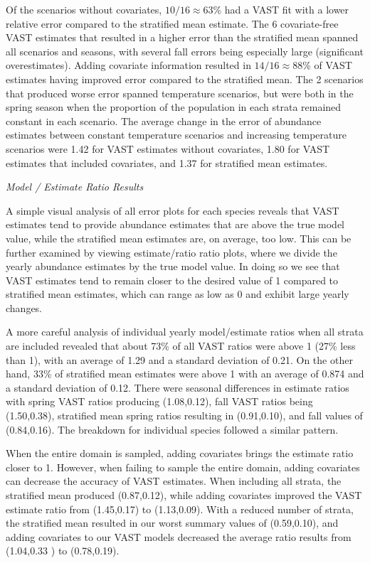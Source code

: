 \documentclass[
  12pt,
]{article}
\begin{document}
Of the scenarios without covariates, \(10/16\approx63\)\% had a VAST fit with a lower relative error compared to the stratified mean estimate. The 6 covariate-free VAST estimates that resulted in a higher error than the stratified mean spanned all scenarios and seasons, with several fall errors being especially large (significant overestimates). Adding covariate information resulted in \(14/16\approx88\)\% of VAST estimates having improved error compared to the stratified mean. The 2 scenarios that produced worse error spanned temperature scenarios, but were both in the spring season when the proportion of the population in each strata remained constant in each scenario. The average change in the error of abundance estimates between constant temperature scenarios and increasing temperature scenarios were 1.42 for VAST estimates without covariates, 1.80 for VAST estimates that included covariates, and 1.37 for stratified mean estimates.

\emph{Model / Estimate Ratio Results}

A simple visual analysis of all error plots for each species reveals that VAST estimates tend to provide abundance estimates that are above the true model value, while the stratified mean estimates are, on average, too low. This can be further examined by viewing estimate/ratio ratio plots, where we divide the yearly abundance estimates by the true model value. In doing so we see that VAST estimates tend to remain closer to the desired value of 1 compared to stratified mean estimates, which can range as low as 0 and exhibit large yearly changes.

A more careful analysis of individual yearly model/estimate ratios when all strata are included revealed that about 73\% of all VAST ratios were above 1 (27\% less than 1), with an average of 1.29 and a standard deviation of 0.21. On the other hand, 33\% of stratified mean estimates were above 1 with an average of 0.874 and a standard deviation of 0.12. There were seasonal differences in estimate ratios with spring VAST ratios producing (1.08,0.12), fall VAST ratios being (1.50,0.38), stratified mean spring ratios resulting in (0.91,0.10), and fall values of (0.84,0.16). The breakdown for individual species followed a similar pattern.

When the entire domain is sampled, adding covariates brings the estimate ratio closer to 1. However, when failing to sample the entire domain, adding covariates can decrease the accuracy of VAST estimates. When including all strata, the stratified mean produced (0.87,0.12), while adding covariates improved the VAST estimate ratio from (1.45,0.17) to (1.13,0.09). With a reduced number of strata, the stratified mean resulted in our worst summary values of (0.59,0.10), and adding covariates to our VAST models decreased the average ratio results from (1.04,0.33 ) to (0.78,0.19).
\end{document}

